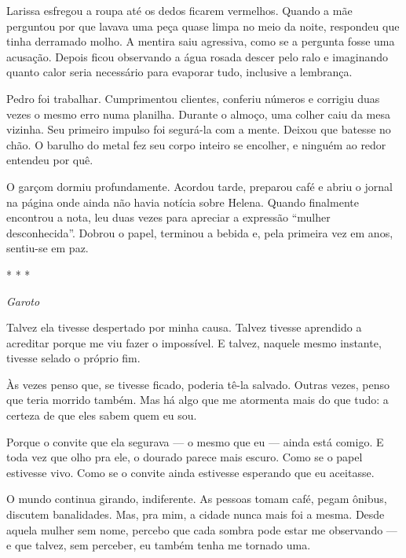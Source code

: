 Larissa esfregou a roupa até os dedos ficarem vermelhos. Quando a mãe perguntou por que lavava uma peça quase limpa no meio da noite, respondeu que tinha derramado molho. A mentira saiu agressiva, como se a pergunta fosse uma acusação. Depois ficou observando a água rosada descer pelo ralo e imaginando quanto calor seria necessário para evaporar tudo, inclusive a lembrança.

Pedro foi trabalhar. Cumprimentou clientes, conferiu números e corrigiu duas vezes o mesmo erro numa planilha. Durante o almoço, uma colher caiu da mesa vizinha. Seu primeiro impulso foi segurá-la com a mente. Deixou que batesse no chão. O barulho do metal fez seu corpo inteiro se encolher, e ninguém ao redor entendeu por quê.

O garçom dormiu profundamente. Acordou tarde, preparou café e abriu o jornal na página onde ainda não havia notícia sobre Helena. Quando finalmente encontrou a nota, leu duas vezes para apreciar a expressão “mulher desconhecida”. Dobrou o papel, terminou a bebida e, pela primeira vez em anos, sentiu-se em paz.

\begin{center}
* * *
\end{center}

\begin{center}
\textit{Garoto}
\end{center}

Talvez ela tivesse despertado por minha causa.  
Talvez tivesse aprendido a acreditar porque me viu fazer o impossível.  
E talvez, naquele mesmo instante, tivesse selado o próprio fim.

Às vezes penso que, se tivesse ficado, poderia tê-la salvado.  
Outras vezes, penso que teria morrido também.  
Mas há algo que me atormenta mais do que tudo:  
a certeza de que eles sabem quem eu sou.

Porque o convite que ela segurava — o mesmo que eu — ainda está comigo.  
E toda vez que olho pra ele, o dourado parece mais escuro.  
Como se o papel estivesse vivo.  
Como se o convite ainda estivesse esperando que eu aceitasse.

\medskip

O mundo continua girando, indiferente.  
As pessoas tomam café, pegam ônibus, discutem banalidades.  
Mas, pra mim, a cidade nunca mais foi a mesma.  
Desde aquela mulher sem nome, percebo que cada sombra pode estar me observando —  
e que talvez, sem perceber, eu também tenha me tornado uma.
